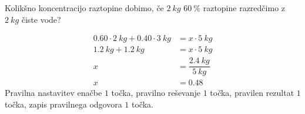 \documentclass[addpoints]{exam}
\begin{document}
\begin{questions}



        \question[4]
        Kolikšno koncentracijo raztopine dobimo, če $2~kg$ $60~\%$ raztopine razredčimo z $2~kg$ čiste vode?

        \begin{solution}[3cm]
            \begin{align*}
                0.60 \cdot 2~kg + 0.40\cdot 3~kg &= x \cdot 5~kg \\
                                 1.2~kg+1.2~kg &= x\cdot 5~kg \\
                                            x &= \dfrac{2.4~kg}{5~kg} \\
                                            x &= 0.48
            \end{align*}
            Pravilna nastavitev enačbe $1$ točka, pravilno reševanje $1$ točka, pravilen rezultat $1$ točka, zapis pravilnega odgovora $1$ točka.
        \end{solution}




\end{questions}
\end{document}
